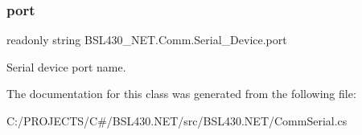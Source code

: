 \subsubsection{\texorpdfstring{port}{port}}
{\footnotesize\ttfamily readonly string B\+S\+L430\+\_\+\+N\+E\+T.\+Comm.\+Serial\+\_\+\+Device.\+port}



Serial device port name. 



The documentation for this class was generated from the following file\+:\begin{DoxyCompactItemize}
\item 
C\+:/\+P\+R\+O\+J\+E\+C\+T\+S/\+C\#/\+B\+S\+L430.\+N\+E\+T/src/\+B\+S\+L430.\+N\+E\+T/Comm\+Serial.\+cs\end{DoxyCompactItemize}
